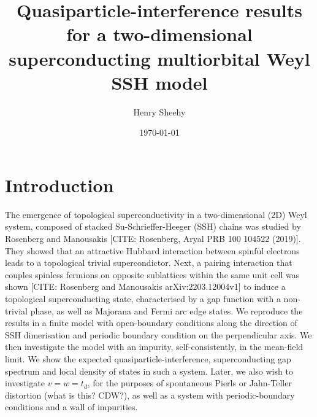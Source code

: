 \title{Quasiparticle-interference results for a two-dimensional superconducting multiorbital Weyl SSH model}
\author{Henry Sheehy}
\date{ \today }
  
\maketitle
  
\tableofcontents

\section{Introduction}
The emergence of topological superconductivity in a two-dimensional (2D) Weyl system, 
composed of stacked Su-Schrieffer-Heeger (SSH) chains was studied by Rosenberg and Manousakis [CITE: Rosenberg, Aryal PRB 100 104522 (2019)].
They showed that an attractive Hubbard interaction between spinful electrons leads to a topological trivial supercondictor.
Next, a pairing interaction that couples spinless fermions on opposite sublattices within the same unit cell was shown [CITE: Rosenberg and Manousakis arXiv:2203.12004v1] to induce a topological superconducting state,
characterised by a gap function with a non-trivial phase, as well as Majorana and Fermi arc edge states.
We reproduce the results in a finite model with open-boundary conditions along the direction of SSH dimerisation and periodic boundary condition on the perpendicular axis.
We then investigate the model with an impurity, self-consistently, in the mean-field limit. 
We show the expected quasiparticle-interference, superconducting gap spectrum and local density of states in such a system.
Later, we also wish to investigate $v=w=t_d$, for the purposes of spontaneous Pierls or Jahn-Teller distortion (what is this? CDW?), as well as a system with periodic-boundary conditions and a wall of impurities.

